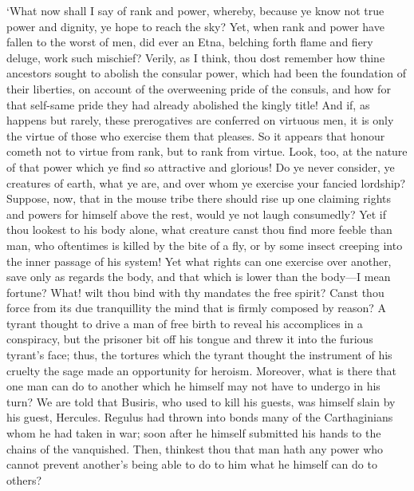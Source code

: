 \documentclass[12pt]{book}
\begin{document}
`What now shall I say of rank and power, whereby, because ye know not
true power and dignity, ye hope to reach the sky? Yet, when rank and
power have fallen to the worst of men, did ever an Etna, belching forth
flame and fiery deluge, work such mischief? Verily, as I think, thou
dost remember how thine ancestors sought to abolish the consular power,
which had been the foundation of their liberties, on account of the
overweening pride of the consuls, and how for that self-same pride they
had already abolished the kingly title! And if, as happens but rarely,
these prerogatives are conferred on virtuous men, it is only the virtue
of those who exercise them that pleases. So it appears that honour
cometh not to virtue from rank, but to rank from virtue. Look, too, at
the nature of that power which ye find so attractive and glorious! Do ye
never consider, ye creatures of earth, what ye are, and over whom ye
exercise your fancied lordship? Suppose, now, that in the mouse tribe
there should rise up one claiming rights and powers for himself above
the rest, would ye not laugh consumedly? Yet if thou lookest to his body
alone, what creature canst thou find more feeble than man, who
oftentimes is killed by the bite of a fly, or by some insect creeping
into the inner passage of his system! Yet what rights can one exercise
over another, save only as regards the body, and that which is lower
than the body---I mean fortune? What! wilt thou bind with thy mandates
the free spirit? Canst thou force from its due tranquillity the mind
that is firmly composed by reason? A tyrant thought to drive a man of
free birth to reveal his accomplices in a conspiracy, but the prisoner
bit off his tongue and threw it into the furious tyrant's face; thus,
the tortures which the tyrant thought the instrument of his cruelty the
sage made an opportunity for heroism. Moreover, what is there that one
man can do to another which he himself may not have to undergo in his
turn? We are told that Busiris, who used to kill his guests, was himself
slain by his guest, Hercules. Regulus had thrown into bonds many of the
Carthaginians whom he had taken in war; soon after he himself submitted
his hands to the chains of the vanquished. Then, thinkest thou that man
hath any power who cannot prevent another's being able to do to him what
he himself can do to others?
\end{document}
